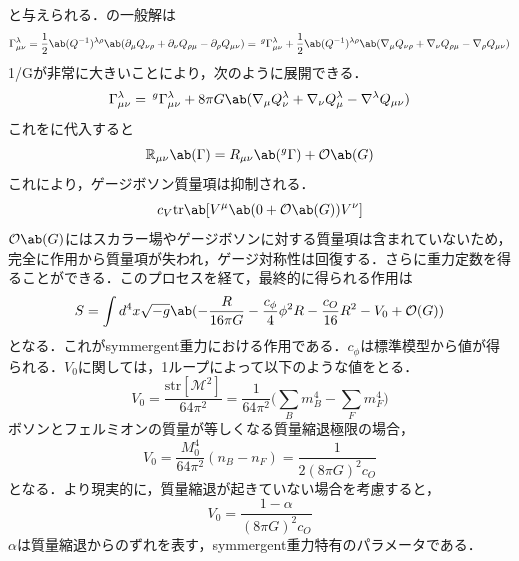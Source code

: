 と与えられる．の一般解は
\begin{dmath}
    \Gamma^\lambda_{\mu\nu}=\frac{1}{2}\ab(Q^{-1})^{\lambda\rho}\ab(\partial_\mu Q_{\nu\rho}+\partial_\nu Q_{\rho\mu}-\partial_\rho Q_{\mu\nu})
    =\,^g\Gamma^\lambda_{\mu\nu}+\frac{1}{2}\ab(Q^{-1})^{\lambda\rho}\ab(\nabla_\mu Q_{\nu\rho}+\nabla_\nu Q_{\rho\mu}-\nabla_\rho Q_{\mu\nu})
\end{dmath}
1/Gが非常に大きいことにより，次のように展開できる．
\begin{dmath}
    \Gamma^\lambda_{\mu\nu}=\,^g\Gamma^\lambda_{\mu\nu}+8\pi G\ab(\nabla_\mu Q^\lambda_\nu+\nabla_\nu Q^\lambda_\mu-\nabla^\lambda Q_{\mu\nu})
\end{dmath}
これをに代入すると
\begin{dmath}
    \mathbb{R}_{\mu\nu}\ab(\Gamma)=R_{\mu\nu}\ab(^g\Gamma)+\mathcal{O}\ab(G)
\end{dmath}
これにより，ゲージボソン質量項は抑制される．
\begin{dmath}
    c_V\mathrm{tr}\ab[V^\mu\ab(0+\mathcal{O}\ab(G)) V^\nu]
\end{dmath}
$\mathcal{O}\ab(G)$にはスカラー場やゲージボソンに対する質量項は含まれていないため，完全に作用から質量項が失われ，ゲージ対称性は回復する．さらに重力定数を得ることができる．このプロセスを経て，最終的に得られる作用は
\begin{dmath}
    S=\int d^4x\sqrt{-g}\ab(-\frac{R}{16\pi G}-\frac{c_\phi}{4}\phi^2R-\frac{c_O}{16}R^2-V_0+\mathcal{O}(G))
\end{dmath}
となる．これがsymmergent重力における作用である．$c_\phi$は標準模型から値が得られる．$V_0$に関しては，1ループによって以下のような値をとる．
\begin{equation}
    V_0=\frac{\mathrm{str}[\mathcal{M}^2]}{64\pi^2}=\frac{1}{64\pi^2}\bigg(\sum_Bm_B^4-\sum_Fm_F^4\bigg)
\end{equation}
ボソンとフェルミオンの質量が等しくなる質量縮退極限の場合，
\begin{equation}
    V_0=\frac{M^4_0}{64\pi^2}(n_B-n_F)=\frac{1}{2(8\pi G)^2c_O}
\end{equation}
となる．より現実的に，質量縮退が起きていない場合を考慮すると，
\begin{dmath}
    V_0=\frac{1-\alpha}{(8\pi G)^2c_O}
\end{dmath}
$\alpha$は質量縮退からのずれを表す，symmergent重力特有のパラメータである．

